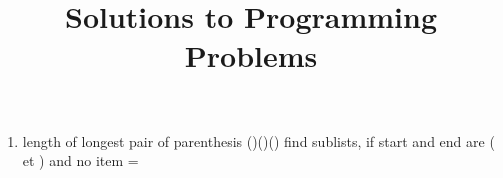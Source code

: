 \documentclass{article}
\title {Solutions to Programming Problems}
\begin{document}
\maketitle

\begin{enumerate}

\item length of longest pair of  parenthesis ()()()
find sublists, if start and end are ( et ) and no item =

\end{enumerate}
\end{document}
